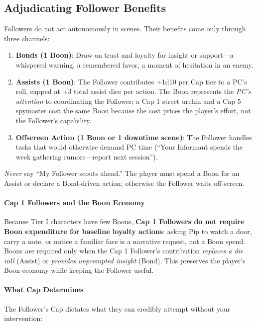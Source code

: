 \subsection{Adjudicating Follower Benefits}
Followers do not act autonomously in scenes. Their benefits come only through three channels:

\begin{enumerate}
  \item \textbf{Bonds (1 Boon)}: Draw on trust and loyalty for insight or support---a whispered warning, a remembered favor, a moment of hesitation in an enemy.
  \item \textbf{Assists (1 Boon)}: The Follower contributes +1d10 per Cap tier to a PC's roll, capped at +3 total assist dice per action. The Boon represents the \emph{PC's attention} to coordinating the Follower; a Cap 1 street urchin and a Cap 5 spymaster cost the same Boon because the cost prices the player's effort, not the Follower's capability.
  \item \textbf{Offscreen Action (1 Boon or 1 downtime scene)}: The Follower handles tasks that would otherwise demand PC time (``Your Informant spends the week gathering rumors---report next session''). 
\end{enumerate}

\textit{Never} say ``My Follower scouts ahead.'' The player must spend a Boon for an Assist or declare a Bond-driven action; otherwise the Follower waits off-screen.

\paragraph{Cap 1 Followers and the Boon Economy}
Because Tier I characters have few Boons, \textbf{Cap 1 Followers do not require Boon expenditure for baseline loyalty actions}: asking Pip to watch a door, carry a note, or notice a familiar face is a narrative request, not a Boon spend. Boons are required only when the Cap 1 Follower's contribution \emph{replaces a die roll} (Assist) or \emph{provides unprompted insight} (Bond). This preserves the player's Boon economy while keeping the Follower useful.

\paragraph{What Cap Determines}
The Follower's Cap dictates what they can credibly attempt without your intervention:

